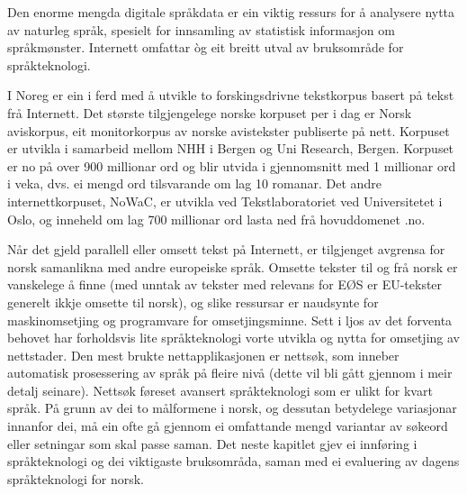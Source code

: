 \begin{multicols}{2}

Den enorme mengda digitale språkdata er ein viktig ressurs for å analysere nytta av naturleg språk, spesielt for innsamling av statistisk informasjon om språkmønster. Internett omfattar òg eit breitt utval av bruksområde for språkteknologi. 

I Noreg er ein i ferd med å utvikle to forskingsdrivne tekstkorpus basert på tekst frå Internett. 
Det største tilgjengelege norske korpuset per i dag er Norsk aviskorpus, eit monitorkorpus av norske avistekster publiserte på nett. 
Korpuset er utvikla i samarbeid mellom NHH i Bergen og Uni Research, Bergen. Korpuset er no på over 900 millionar ord og blir utvida i gjennomsnitt med 1 millionar ord i veka, dvs. ei mengd ord tilsvarande om lag 10 romanar. 
Det andre internettkorpuset, NoWaC, er utvikla ved Tekstlaboratoriet ved Universitetet i Oslo, og inneheld om lag 700 millionar ord lasta ned frå hovuddomenet .no. 

Når det gjeld parallell eller omsett tekst på Internett, er tilgjenget avgrensa for norsk samanlikna med andre europeiske språk. 
Omsette tekster til og frå norsk er vanskelege å finne (med unntak av tekster med relevans for EØS er EU-tekster generelt ikkje omsette til norsk), og slike ressursar er naudsynte for maskinomsetjing og programvare for omsetjingsminne. 
Sett i ljos av det forventa behovet har forholdsvis lite språkteknologi vorte utvikla og nytta for omsetjing av nettstader. 
Den mest brukte nettapplikasjonen er nettsøk, som inneber automatisk prosessering av språk på fleire nivå (dette vil bli gått gjennom i meir detalj seinare). Nettsøk føreset avansert språkteknologi som er ulikt for kvart språk. 
På grunn av dei to målformene i norsk, og dessutan betydelege variasjonar innanfor dei, må ein ofte gå gjennom ei omfattande mengd variantar av søkeord eller setningar som skal passe saman. 
Det neste kapitlet gjev ei innføring i språkteknologi og dei viktigaste bruksområda, saman med ei evaluering av dagens språkteknologi for norsk.

\end{multicols}

\clearpage



